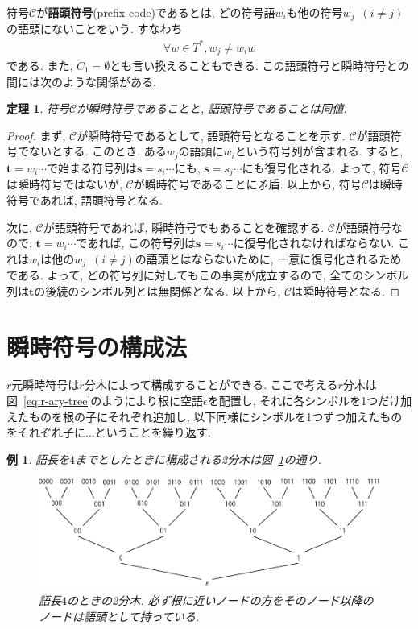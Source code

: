 \documentclass[12pt]{ltjsarticle}
\newcommand*{\fgref}[1]{図~\ref{#1}}
\newtheorem{example}{例}
\newtheorem{theorem}{定理}
\begin{document}
符号$\mathcal{C}$が\textbf{語頭符号}(prefix code)であるとは, どの符号語$w_i$も他の符号$w_j \enspace (i \neq j)$の語頭にないことをいう.
すなわち
\begin{align*}
  \forall w \in T^*, w_j \neq w_i w
\end{align*}
である.
また, $C_1 = \emptyset$とも言い換えることもできる.
この語頭符号と瞬時符号との間には次のような関係がある.
\begin{screen}
  \begin{theorem}
    符号$\mathcal{C}$が瞬時符号であることと, 語頭符号であることは同値.
  \end{theorem}
\end{screen}
\begin{proof}
  まず, $\mathcal{C}$が瞬時符号であるとして, 語頭符号となることを示す.
  $\mathcal{C}$が語頭符号でないとする.
  このとき, ある$w_j$の語頭に$w_i$という符号列が含まれる.
  すると, $\boldsymbol{t} = w_i \cdots$で始まる符号列は$\boldsymbol{s} = s_i \cdots$にも,
  $\boldsymbol{s} = s_j \cdots$にも復号化される.
  よって, 符号$\mathcal{C}$は瞬時符号ではないが, $\mathcal{C}$が瞬時符号であることに矛盾.
  以上から, 符号$\mathcal{C}$は瞬時符号であれば, 語頭符号となる.

  次に, $\mathcal{C}$が語頭符号であれば, 瞬時符号でもあることを確認する.
  $\mathcal{C}$が語頭符号なので, $\boldsymbol{t} = w_i \cdots$であれば,
  この符号列は$\boldsymbol{s} = s_i \cdots$に復号化されなければならない.
  これは$w_i$は他の$w_j \enspace (i \neq j)$の語頭とはならないために, 一意に復号化されるためである.
  よって, どの符号列に対してもこの事実が成立するので,
  全てのシンボル列は$\boldsymbol{t}$の後続のシンボル列とは無関係となる.
  以上から, $\mathcal{C}$は瞬時符号となる.
\end{proof}

\section{瞬時符号の構成法}
$r$元瞬時符号は$r$分木によって構成することができる.
ここで考える$r$分木は\fgref{eq:r-ary-tree}のようにより根に空語$\epsilon$を配置し,
それに各シンボルを1つだけ加えたものを根の子にそれぞれ追加し,
以下同様にシンボルを1つずつ加えたものをそれぞれ子に...ということを繰り返す.
\begin{example}
  \label{ex:make-tree}
  語長を$4$までとしたときに構成される2分木は\fgref{fg:binary-tree}の通り.
  \begin{figure}
    \centering
    \includegraphics{image/2分木.pdf}
    \caption{語長$4$のときの2分木. 必ず根に近いノードの方をそのノード以降のノードは語頭として持っている.}
    \label{fg:binary-tree}
  \end{figure}
\end{example}
\end{document}
